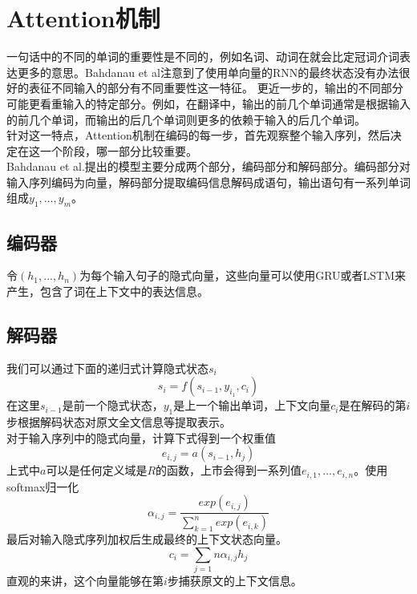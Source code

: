 \section{Attention机制}
一句话中的不同的单词的重要性是不同的，例如名词、动词在就会比定冠词介词表达更多的意思。Bahdanau et al\cite{Bahdanauetal.2014}注意到了使用单向量的RNN的最终状态没有办法很好的表征不同输入的部分有不同重要性这一特征。
更近一步的，输出的不同部分可能更看重输入的特定部分。例如，在翻译中，输出的前几个单词通常是根据输入的前几个单词，而输出的后几个单词则更多的依赖于输入的后几个单词。\\
针对这一特点，Attention机制在编码的每一步，首先观察整个输入序列，然后决定在这一个阶段，哪一部分比较重要。\\
Bahdanau et al.提出的模型主要分成两个部分，编码部分和解码部分。编码部分对输入序列编码为向量，解码部分提取编码信息解码成语句，输出语句有一系列单词组成$y_1,...,y_m$。
\subsection{编码器}
令$(h_1,...,h_n)$为每个输入句子的隐式向量，这些向量可以使用GRU或者LSTM来产生，包含了词在上下文中的表达信息。
\subsection{解码器}
我们可以通过下面的递归式计算隐式状态$s_i$
\begin{equation}
s_i = f(s_{i-1},y_{i_1},c_i)
\end{equation}
在这里$s_{i-1}$是前一个隐式状态，$y_1$是上一个输出单词，上下文向量$c_i$是在解码的第$i$步根据解码状态对原文全文信息等提取表示。\\
对于输入序列中的隐式向量，计算下式得到一个权重值
\begin{equation}
e_{i,j} = a(s_{i-1},h_j)
\end{equation}
上式中$a$可以是任何定义域是$R$的函数，上市会得到一系列值$e_{i,1},...,e_{i,n}$。使用softmax归一化
\begin{equation}
\alpha_{i,j} = \frac{exp(e_{i,j})}{\sum_{k=1}^nexp(e_{i,k})}
\end{equation}
最后对输入隐式序列加权后生成最终的上下文状态向量。
\begin{equation}
c_i = \sum_{j=1}{n}\alpha_{i,j}h_j
\end{equation}
直观的来讲，这个向量能够在第$i$步捕获原文的上下文信息。
